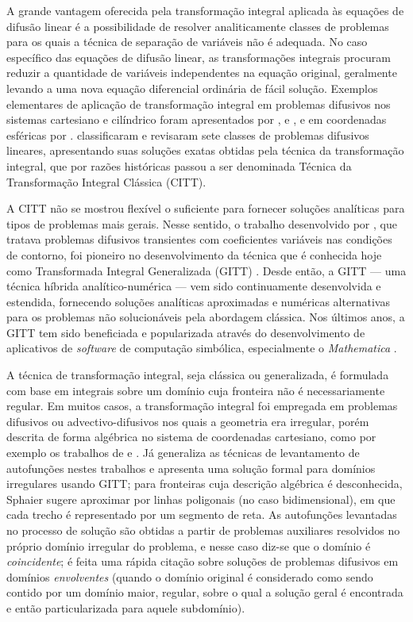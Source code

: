 A grande vantagem oferecida pela transformação integral aplicada às equações de difusão linear é a possibilidade de resolver analiticamente classes de
problemas para os quais a técnica de separação de variáveis não é adequada.
No caso específico das equações de difusão linear, as transformações integrais procuram reduzir a quantidade de variáveis independentes
na equação original, geralmente levando a uma nova equação diferencial ordinária de fácil solução. Exemplos elementares de aplicação
de transformação integral em problemas difusivos nos sistemas cartesiano e cilíndrico foram apresentados por \cite{artigo_doetsch}, \cite{artigo_sneddon} e \cite{livro_tranter},
e em coordenadas esféricas por \cite{artigo_olcer}.
\cite{livro_unified} classificaram e revisaram sete classes de problemas difusivos lineares, apresentando suas soluções
exatas obtidas pela técnica da transformação integral, que por razões históricas passou a ser denominada Técnica da Transformação Integral Clássica (CITT).

A CITT não se mostrou flexível o suficiente para fornecer
soluções analíticas para tipos de problemas mais gerais. Nesse sentido, o trabalho desenvolvido por \cite{artigo_murray},
que tratava problemas difusivos transientes com coeficientes variáveis nas condições de contorno, foi pioneiro no desenvolvimento da técnica
que é conhecida hoje como Transformada Integral Generalizada (GITT) \citep{livro_integral_transforms_cotta}. Desde então, a GITT --- uma técnica
híbrida analítico-numérica --- vem sido continuamente desenvolvida e estendida, fornecendo soluções analíticas aproximadas e numéricas alternativas
para os problemas não solucionáveis pela abordagem clássica. Nos últimos anos, a GITT tem sido beneficiada e popularizada através do desenvolvimento de
aplicativos de \textit{software} de computação simbólica, especialmente o \textit{Mathematica}\textsuperscript{\textregistered} \citep{artigo_mathematica}.

A técnica de transformação integral, seja clássica ou generalizada, é formulada com base em integrais sobre um domínio cuja
fronteira não é necessariamente regular. Em muitos casos, a transformação integral foi empregada em problemas difusivos ou advectivo-difusivos nos quais a geometria
era irregular, porém descrita de forma algébrica no sistema de coordenadas cartesiano, como por exemplo os trabalhos de \cite{artigo_aparecido, artigo_aparecido_2, artigo_aparecido_3, artigo_fausto} e \cite{artigo_perez}.
Já \cite{tese_sphaier} generaliza as técnicas de levantamento de autofunções nestes trabalhos e apresenta uma solução formal para domínios irregulares usando GITT;
para fronteiras cuja descrição algébrica é desconhecida, Sphaier sugere aproximar por linhas poligonais (no caso bidimensional), em que cada
trecho é representado por um segmento de reta. As autofunções levantadas no processo de solução são obtidas a partir de problemas auxiliares resolvidos no próprio
domínio irregular do problema, e nesse caso diz-se que o domínio é \textit{coincidente}; é feita uma rápida citação sobre soluções de problemas difusivos em domínios \textit{envolventes}
(quando o domínio original é considerado como sendo contido por um domínio maior, regular, sobre o qual a solução geral é encontrada e então particularizada
para aquele subdomínio).

